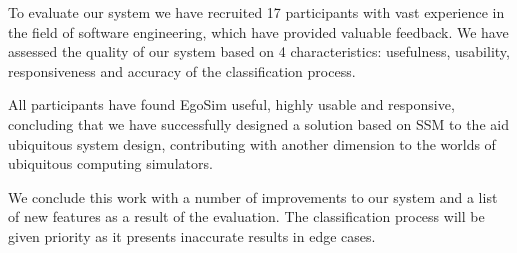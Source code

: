 
To evaluate our system we have recruited 17 participants with vast experience in the field of software engineering, which have provided valuable feedback. We have assessed the quality of our system based on 4 characteristics: usefulness, usability, responsiveness and accuracy of the classification process.


All participants have found EgoSim useful, highly usable and responsive, concluding that we have successfully designed a solution based on SSM to the aid ubiquitous system design, contributing with another dimension to the worlds of ubiquitous computing simulators.





We conclude this work with a number of improvements to our system and a list of new features as a result of the evaluation. The classification process will be given priority as it presents inaccurate results in edge cases.

\endgroup			

\vfill